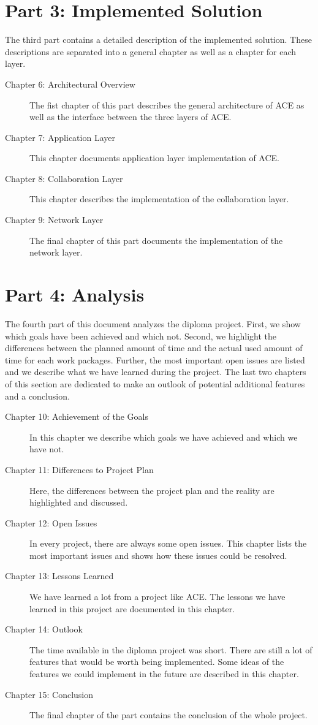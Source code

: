  
\section*{Part 3: Implemented Solution}
The third part contains a detailed description of the implemented solution.
These descriptions are separated into a general chapter as well as a
chapter for each layer.

\begin{description}
 \item[Chapter 6: Architectural Overview] The fist chapter of this part describes the general architecture of ACE as well as the interface between the three layers of ACE.
 \item[Chapter 7: Application Layer] This chapter documents application layer implementation of ACE.
 \item[Chapter 8: Collaboration Layer] This chapter describes the implementation of the collaboration layer.
 \item[Chapter 9: Network Layer] The final chapter of this part documents the implementation of the network layer.
\end{description}

 
\section*{Part 4: Analysis}
The fourth part of this document analyzes the diploma project. First, we
show which goals have been achieved and which not. Second, we highlight
the differences between the planned amount of time and the actual used
amount of time for each work packages. Further, the most important open
issues are listed and we describe what we have learned during the project.
The last two chapters of this section are dedicated to make an outlook
of potential additional features and a conclusion.

\begin{description}
 \item[Chapter 10: Achievement of the Goals] In this chapter we describe which goals we have achieved and which we have not.
 \item[Chapter 11: Differences to Project Plan] Here, the differences between the project plan and the reality are highlighted and discussed.
 \item[Chapter 12: Open Issues] In every project, there are always some open issues. This chapter lists the most important issues and shows how these issues could be resolved.
 \item[Chapter 13: Lessons Learned] We have learned a lot from a project like ACE. The lessons we have learned in this project are documented in this chapter.
 \item[Chapter 14: Outlook] The time available in the diploma project was short. There are still a lot of features that would be worth being implemented. Some ideas of the features we could implement in the future are described in this chapter.
 \item[Chapter 15: Conclusion] The final chapter of the part contains the conclusion of the whole project.
\end{description}
 
